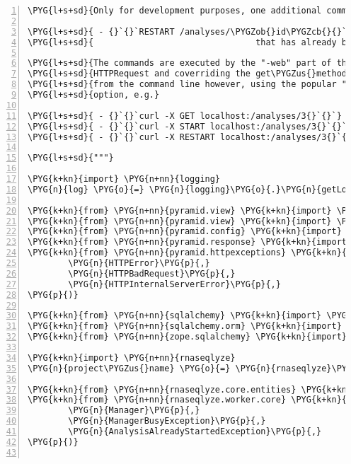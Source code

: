 \begin{Verbatim}[commandchars=\\\{\},numbers=left,firstnumber=1,stepnumber=5]
\PYG{l+s+sd}{Only for development purposes, one additional command exists:}

\PYG{l+s+sd}{ - {}`{}`RESTART /analyses/\PYGZob{}id\PYGZcb{}{}`{}`:  Restart an analysis}
\PYG{l+s+sd}{                                that has already been started.}

\PYG{l+s+sd}{The commands are executed by the "-web" part of the application by subclassing}
\PYG{l+s+sd}{HTTPRequest and coverriding the get\PYGZus{}method() function. They can also be executed}
\PYG{l+s+sd}{from the command line however, using the popular "curl" binary with the "-X"}
\PYG{l+s+sd}{option, e.g.}

\PYG{l+s+sd}{ - {}`{}`curl -X GET localhost:/analyses/3{}`{}`}
\PYG{l+s+sd}{ - {}`{}`curl -X START localhost:/analyses/3{}`{}`}
\PYG{l+s+sd}{ - {}`{}`curl -X RESTART localhost:/analyses/3{}`{}`}

\PYG{l+s+sd}{"""}

\PYG{k+kn}{import} \PYG{n+nn}{logging}
\PYG{n}{log} \PYG{o}{=} \PYG{n}{logging}\PYG{o}{.}\PYG{n}{getLogger}\PYG{p}{(}\PYG{n}{\PYGZus{}\PYGZus{}name\PYGZus{}\PYGZus{}}\PYG{p}{)}

\PYG{k+kn}{from} \PYG{n+nn}{pyramid.view} \PYG{k+kn}{import} \PYG{n}{view\PYGZus{}config}
\PYG{k+kn}{from} \PYG{n+nn}{pyramid.view} \PYG{k+kn}{import} \PYG{n}{view\PYGZus{}defaults}
\PYG{k+kn}{from} \PYG{n+nn}{pyramid.config} \PYG{k+kn}{import} \PYG{n}{Configurator}
\PYG{k+kn}{from} \PYG{n+nn}{pyramid.response} \PYG{k+kn}{import} \PYG{n}{Response}
\PYG{k+kn}{from} \PYG{n+nn}{pyramid.httpexceptions} \PYG{k+kn}{import} \PYG{p}{(}
        \PYG{n}{HTTPError}\PYG{p}{,}
        \PYG{n}{HTTPBadRequest}\PYG{p}{,}
        \PYG{n}{HTTPInternalServerError}\PYG{p}{,}
\PYG{p}{)}

\PYG{k+kn}{from} \PYG{n+nn}{sqlalchemy} \PYG{k+kn}{import} \PYG{n}{create\PYGZus{}engine}
\PYG{k+kn}{from} \PYG{n+nn}{sqlalchemy.orm} \PYG{k+kn}{import} \PYG{n}{sessionmaker}\PYG{p}{,} \PYG{n}{scoped\PYGZus{}session}
\PYG{k+kn}{from} \PYG{n+nn}{zope.sqlalchemy} \PYG{k+kn}{import} \PYG{n}{ZopeTransactionExtension}

\PYG{k+kn}{import} \PYG{n+nn}{rnaseqlyze}
\PYG{n}{project\PYGZus{}name} \PYG{o}{=} \PYG{n}{rnaseqlyze}\PYG{o}{.}\PYG{n}{project\PYGZus{}name} \PYG{o}{+} \PYG{l+s}{"}\PYG{l+s}{-worker}\PYG{l+s}{"}

\PYG{k+kn}{from} \PYG{n+nn}{rnaseqlyze.core.entities} \PYG{k+kn}{import} \PYG{n}{Analysis}
\PYG{k+kn}{from} \PYG{n+nn}{rnaseqlyze.worker.core} \PYG{k+kn}{import} \PYG{p}{(}
        \PYG{n}{Manager}\PYG{p}{,}
        \PYG{n}{ManagerBusyException}\PYG{p}{,}
        \PYG{n}{AnalysisAlreadyStartedException}\PYG{p}{,}
\PYG{p}{)}


\end{Verbatim}
